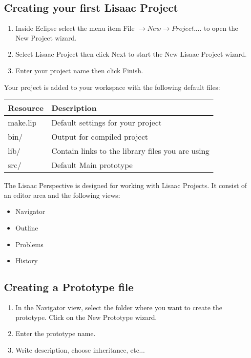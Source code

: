 \documentclass{article}
\begin{document}
\subsection{Creating your first Lisaac Project} 

\begin{enumerate}
\item{Inside Eclipse select the menu item File $\rightarrow New \rightarrow Project....$ to open the New Project wizard.}
\item{Select Lisaac Project then click Next to start the New Lisaac Project wizard.}
\item{Enter your project name then click Finish.}
\end{enumerate}
 
Your project is added to your workspace with the following default files: 
\begin{table}[htbp]
\begin{center}
\begin{tabular}{|l|l|}
\hline
Resource & Description \\
\hline
make.lip & Default settings for your project\\
bin/ & Output for compiled project\\
lib/ & Contain links to the library files you are using\\
src/ & Default Main prototype\\
\hline
\end{tabular}
\end{center}
\end{table}

The Lisaac Perspective is designed for working with Lisaac Projects. It consist of an editor area and the following views:
\begin{itemize}
\item{Navigator}
\item{Outline}
\item{Problems}
\item{History}
\end{itemize}

\subsection{Creating a Prototype file} 
\begin{enumerate} 
\item{In the Navigator view, select the folder where you want to create the prototype. Click on the New Prototype wizard.}
\item{Enter the prototype name.}
\item{Write description, choose inheritance, etc...}
\end{enumerate}
\end{document}
